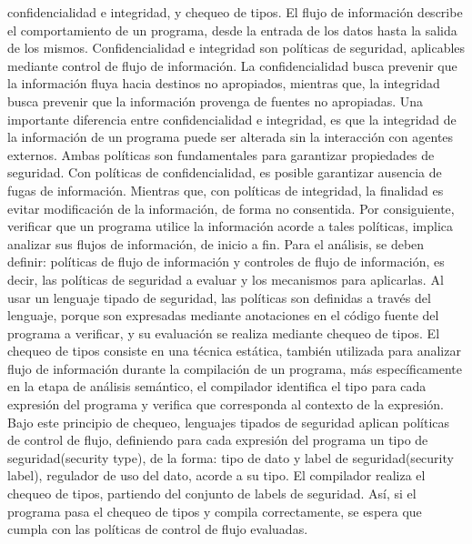 confidencialidad e integridad, y chequeo de tipos.\newline 
El flujo de información describe el comportamiento de un programa, desde la
entrada de los datos hasta la salida de los mismos.\newline 
Confidencialidad e integridad son políticas de seguridad, aplicables mediante
control de flujo de información. La confidencialidad busca prevenir que la
información fluya hacia destinos no apropiados, mientras que, la integridad
busca prevenir que la información provenga de fuentes no apropiadas. Una
importante diferencia entre confidencialidad e integridad, es que la integridad
de la información de un programa puede ser alterada sin la interacción con
agentes externos.\newline %
Ambas políticas son fundamentales para garantizar propiedades de seguridad. Con
políticas de confidencialidad, es posible garantizar ausencia de fugas de
información. Mientras que, con políticas de integridad, la finalidad es evitar
modificación de la información, de forma no consentida.\newline
Por consiguiente, verificar que un programa utilice la información acorde a
tales políticas, implica analizar sus flujos de información, de inicio a fin.
Para el análisis, se deben definir: políticas de flujo de información y
controles de flujo de información, es decir, las políticas de seguridad a
evaluar y los mecanismos para aplicarlas.\newline 
Al usar un lenguaje tipado de seguridad, las políticas son definidas a través
del lenguaje, porque son expresadas mediante anotaciones en el código fuente del
programa a verificar, y su evaluación se realiza mediante chequeo de tipos. El
chequeo de tipos consiste en una técnica estática, también utilizada para
analizar flujo de información durante la compilación de un programa, más
específicamente en la etapa de análisis semántico, el compilador identifica el
tipo para cada expresión del programa y verifica que corresponda al contexto de
la expresión.
Bajo este principio de chequeo, lenguajes tipados de seguridad aplican
políticas de control de flujo, definiendo para cada expresión del programa un
tipo de seguridad(security type), de la forma:  tipo de dato y label de
seguridad(security label), regulador de uso del dato, acorde a su tipo. El
compilador realiza el chequeo de tipos, partiendo del conjunto de labels de
seguridad. Así, si el programa pasa el chequeo de tipos y compila correctamente,
se espera que cumpla con las políticas de control de flujo evaluadas.